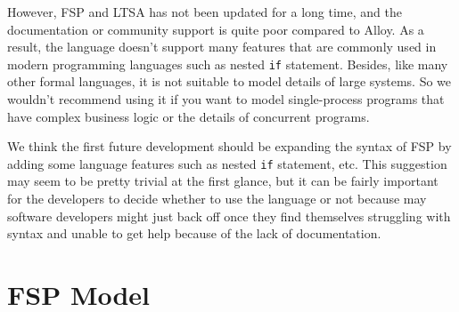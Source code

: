 \documentclass[titlepage]{article}
\begin{document}
However, FSP and LTSA has not been updated for a long time, and the documentation or community support is quite poor compared to Alloy. As a result, the language doesn't support many features that are commonly used in modern programming languages such as nested \texttt{if} statement. Besides, like many other formal languages, it is not suitable to model details of large systems. So we wouldn't recommend using it if you want to model single-process programs that have complex business logic or the details of concurrent programs.

We think the first future development should be expanding the syntax of FSP by adding some language features such as nested \texttt{if} statement, etc. This suggestion may seem to be pretty trivial at the first glance, but it can be fairly important for the developers to decide whether to use the language or not because may software developers might just back off once they find themselves struggling with syntax and unable to get help because of the lack of documentation.

\section{FSP Model}
\end{document}
